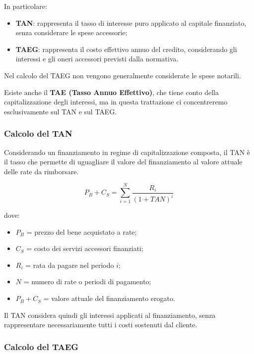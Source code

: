 \medskip

\noindent In particolare:

\begin{itemize}
    \item \textbf{TAN}: rappresenta il tasso di interesse puro
    applicato al capitale finanziato, senza considerare le
    spese accessorie;

    \item \textbf{TAEG}: rappresenta il costo effettivo annuo
    del credito, considerando gli interessi e gli oneri
    accessori previsti dalla normativa.
\end{itemize}

\noindent Nel calcolo del TAEG non vengono generalmente
considerate le spese notarili.

\medskip

\noindent Esiste anche il \textbf{TAE (Tasso Annuo Effettivo)},
che tiene conto della capitalizzazione degli interessi,
ma in questa trattazione ci concentreremo esclusivamente
sul TAN e sul TAEG.

\subsubsection*{Calcolo del TAN}

\noindent Considerando un finanziamento in regime di
capitalizzazione composta, il TAN è il tasso che permette
di uguagliare il valore del finanziamento al valore attuale
delle rate da rimborsare.

\[
\boxed{
P_B+C_S=
\sum_{i=1}^{N}
\frac{R_i}{(1+TAN)^i}
}
\]

\noindent dove:

\begin{itemize}
    \item $P_B$ = prezzo del bene acquistato a rate;
    \item $C_S$ = costo dei servizi accessori finanziati;
    \item $R_i$ = rata da pagare nel periodo $i$;
    \item $N$ = numero di rate o periodi di pagamento;
    \item $P_B+C_S$ = valore attuale del finanziamento erogato.
\end{itemize}

\noindent Il TAN considera quindi gli interessi applicati
al finanziamento, senza rappresentare necessariamente
tutti i costi sostenuti dal cliente.

\subsubsection*{Calcolo del TAEG}

